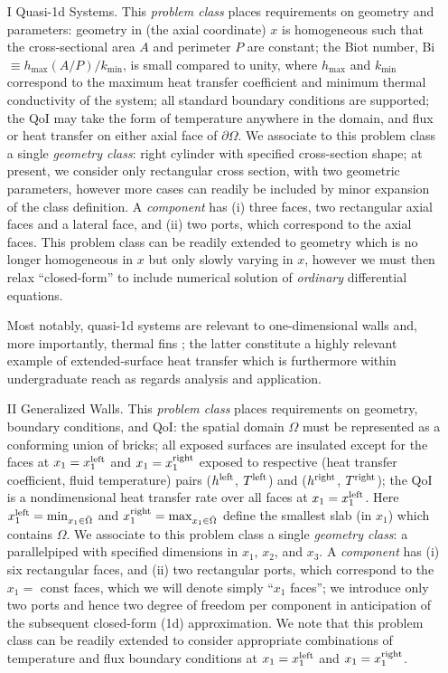\documentclass[preprint,12pt]{article}
\begin{document}
\begin{enumerate}
\begin{itemize}
\item[I] Quasi-1d Systems.  This {\em problem class} places requirements on geometry and parameters: geometry in (the axial coordinate) $x$ is homogeneous such that the cross-sectional area $A$ and perimeter $P$ are constant; the Biot number, Bi $\equiv h_{\max} (A/P)/k_{\min}$, is small compared to unity, where $h_{\max}$ and $k_{\min}$ correspond to the maximum heat transfer coefficient and minimum thermal conductivity of the system; all standard boundary conditions are supported; the QoI may take the form of temperature anywhere in the domain, and flux or heat transfer on either axial face of $\partial \Omega$.  We associate to this problem class a single {\em geometry class}: right cylinder with specified cross-section shape; at present, we consider only rectangular cross section, with two geometric parameters, however more cases can readily be included by minor expansion of the class definition. A {\em component} has (i) three faces, two rectangular axial faces and a lateral face, and (ii) two ports, which correspond to the axial faces. This problem class can be readily extended to geometry which is no longer homogeneous in $x$ but only slowly varying in $x$, however we must then relax ``closed-form'' to include numerical solution of {\em ordinary} differential equations.

Most notably, quasi-1d systems are relevant to one-dimensional walls and, more importantly, thermal fins \cite{Lienhard}; the latter constitute a highly relevant example of extended-surface heat transfer which is furthermore within undergraduate reach as regards analysis and application.

\item[II] Generalized Walls. This {\em problem class} places requirements on geometry, boundary conditions, and QoI: the spatial domain $\Omega$ must be represented as a conforming union of bricks; all exposed surfaces are insulated except for the faces at $x_1 = x_1^{\rm left}$ and $x_1 = x_1^{\rm right}$ exposed to respective (heat transfer coefficient, fluid temperature) pairs ($h^{\rm left}$, $T^{\rm left}$) and ($h^{\rm right}$, $T^{\rm right}$); the QoI is a nondimensional heat transfer rate over all  faces at $x_1 = x_1^{\rm left}$. Here $x_1^{\rm left} = \min_{x_1 \in \bar{\Omega}}$ and $x_1^{\rm right} = \max_{x_1 \in \bar \Omega}$ define the smallest slab (in $x_1$) which contains  $\Omega$. We associate to this problem class a single {\em geometry class}: a parallelpiped with specified dimensions in $x_1$, $x_2$, and $x_3$. A {\em component} has (i) six rectangular faces, and (ii) two rectangular ports, which correspond to the $x_1 = \text{ const}$ faces, which we will denote simply ``$x_1$ faces''; we introduce only two ports and hence two degree of freedom per component in anticipation of the subsequent closed-form (1d) approximation. We note that this problem class can be readily extended to consider appropriate combinations of temperature and flux boundary conditions at $x_1 = x_1^{\rm left}$ and $x_1 = x_1^{\rm right}$.


\end{itemize}
\end{enumerate}
\end{document}
